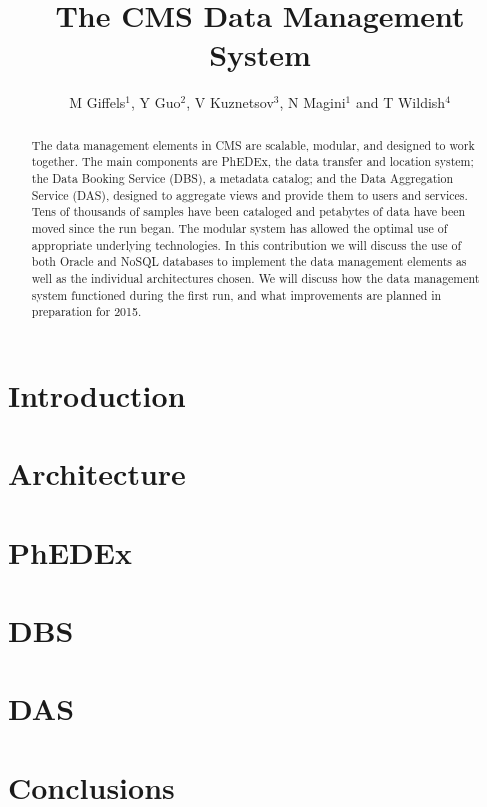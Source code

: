 \documentclass[a4paper]{jpconf}
\begin{document}
\title{The CMS Data Management System}

\author{M Giffels$^1$, Y Guo$^2$, V Kuznetsov$^3$,
        N Magini$^1$ and T Wildish$^4$}

\address{$^1$ CERN, CH-1211 Gen\`eve 23, Switzerland }
\address{$^2$ Fermi National Accelerator Laboratory, Batavia, Il, USA }
\address{$^3$ Cornell University, Ithaca, NY, USA }
\address{$^4$ Princeton University, Princeton, NJ, USA }


\begin{abstract}
The data management elements in CMS are scalable, modular, and designed to work together. The main components are PhEDEx, the data transfer and location system; the Data Booking Service (DBS), a metadata catalog; and the Data Aggregation Service (DAS), designed to aggregate views and provide them to users and services. Tens of thousands of samples have been cataloged and petabytes of data have been moved since the run began. The modular system has allowed the optimal use of appropriate underlying technologies. In this contribution we will discuss the use of both Oracle and NoSQL databases to implement the data management elements as well as the individual architectures chosen. We will discuss how the data management system functioned during the first run, and what improvements are planned in preparation for 2015.
\end{abstract}

\section{Introduction}


\section{Architecture}


\section{PhEDEx}


\section{DBS}


\section{DAS}


\section{Conclusions}


\par

\end{document}
